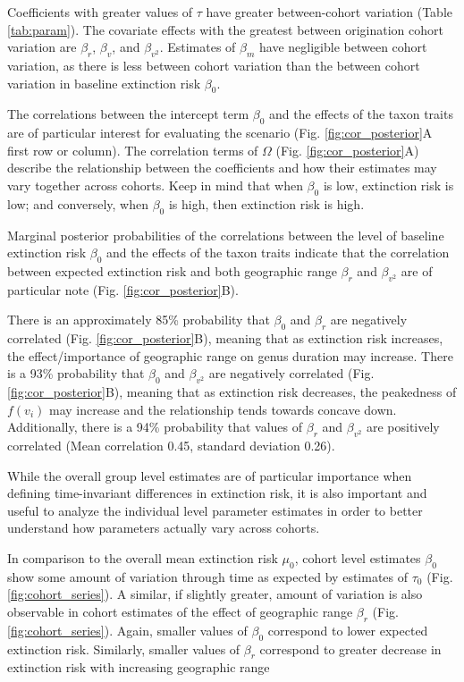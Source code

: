 \documentclass{article}
\begin{document}
Coefficients with greater values of \(\tau\) have greater between-cohort variation (Table \ref{tab:param}). The covariate effects with the greatest between origination cohort variation are \(\beta_{r}\), \(\beta_{v}\), and \(\beta_{v^{2}}\). Estimates of \(\beta_{m}\) have negligible between cohort variation, as there is less between cohort variation than the between cohort variation in baseline extinction risk \(\beta_{0}\). 

The correlations between the intercept term \(\beta_{0}\) and the effects of the taxon traits are of particular interest for evaluating the \citet{Jablonski1986} scenario (Fig. \ref{fig:cor_posterior}A first row or column). The correlation terms of \(\Omega\) (Fig. \ref{fig:cor_posterior}A) describe the relationship between the coefficients and how their estimates may vary together across cohorts. Keep in mind that when \(\beta_{0}\) is low, extinction risk is low; and conversely, when \(\beta_{0}\) is high, then extinction risk is high.

Marginal posterior probabilities of the correlations between the level of baseline extinction risk \(\beta_{0}\) and the effects of the taxon traits indicate that the correlation between expected extinction risk and both geographic range \(\beta_{r}\) and \(\beta_{v^{2}}\) are of particular note (Fig. \ref{fig:cor_posterior}B). 

There is an approximately 85\% probability that \(\beta_{0}\) and \(\beta_{r}\) are negatively correlated (Fig. \ref{fig:cor_posterior}B), meaning that as extinction risk increases, the effect/importance of geographic range on genus duration may increase. There is a 93\% probability that \(\beta_{0}\) and \(\beta_{v^{2}}\) are negatively correlated (Fig. \ref{fig:cor_posterior}B), meaning that as extinction risk decreases, the peakedness of \(f(v_{i})\) may increase and the relationship tends towards concave down. Additionally, there is a 94\% probability that values of \(\beta_{r}\) and \(\beta_{v^{2}}\) are positively correlated (Mean correlation 0.45, standard deviation 0.26).

While the overall group level estimates are of particular importance when defining time-invariant differences in extinction risk, it is also important and useful to analyze the individual level parameter estimates in order to better understand how parameters actually vary across cohorts.

In comparison to the overall mean extinction risk \(\mu_{0}\), cohort level estimates \(\beta_{0}\) show some amount of variation through time as expected by estimates of \(\tau_{0}\) (Fig. \ref{fig:cohort_series}). A similar, if slightly greater, amount of variation is also observable in cohort estimates of the effect of geographic range \(\beta_{r}\) (Fig. \ref{fig:cohort_series}). Again, smaller values of \(\beta_{0}\) correspond to lower expected extinction risk. Similarly, smaller values of \(\beta_{r}\) correspond to greater decrease in extinction risk with increasing geographic range 
\end{document}
